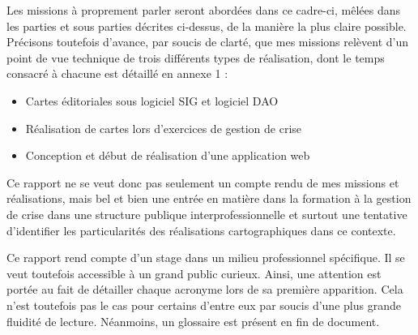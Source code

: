 \documentclass[10pt,a4paper]{report} %
\begin{document}
Les missions à proprement parler seront abordées dans ce cadre-ci, mêlées dans les parties et sous parties décrites ci-dessus, de la manière la plus claire possible. Précisons toutefois d’avance, par soucis de clarté, que mes missions relèvent d’un point de vue technique de trois différents types de réalisation, dont le temps consacré à chacune est détaillé en annexe 1 : 


\begin{itemize}
    \item Cartes éditoriales sous logiciel SIG et logiciel DAO
    \item Réalisation de cartes lors d’exercices de gestion de crise
    \item Conception et début de réalisation d’une application web
\end{itemize}

Ce rapport ne se veut donc pas seulement un compte rendu de mes missions et réalisations, mais bel et bien une entrée en matière dans la formation à la gestion de crise dans une structure publique interprofessionnelle et surtout une tentative d’identifier les particularités des réalisations cartographiques dans ce contexte.

Ce rapport rend compte d’un stage dans un milieu professionnel spécifique. Il se veut toutefois accessible à un grand public curieux. Ainsi, une attention est portée au fait de détailler chaque acronyme lors de sa première apparition. Cela n’est toutefois pas le cas pour certains d’entre eux par soucis d’une plus grande fluidité de lecture. Néanmoins, un glossaire est présent en fin de document.



\newpage
\thispagestyle{empty}
\mbox{}
\newpage

\end{document}
